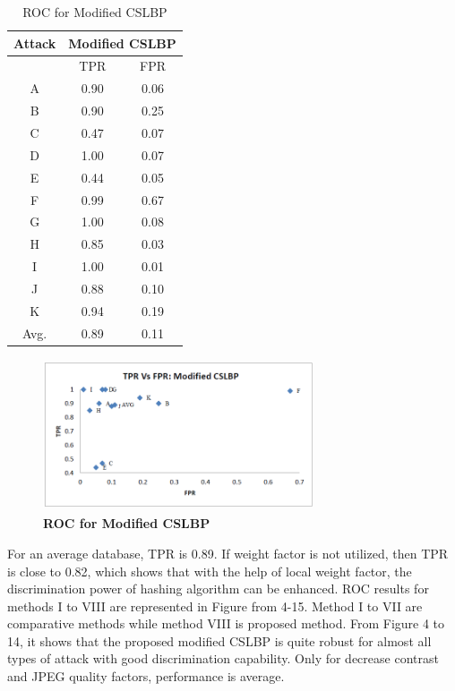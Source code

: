 \documentclass[12pt,a4paper]{jihmsp}
\begin{document}
{{\begin{table}[h]
	\centering
	
	\footnotesize
	
	\centering
	\begin{tabular}{*3c}
		
		\toprule
		
		Attack
		
		&  \multicolumn{2}{c}{ Modified CSLBP} 
		
		
		\\
		\midrule
		{}   &  TPR  &  FPR       \\
		
		
		A	& 0.90	& 0.06 \\
		B	& 0.90	& 0.25 \\
		C	& 0.47	& 0.07 \\
		D	& 1.00	& 0.07 \\
		E	& 0.44	& 0.05 \\
		F	& 0.99	& 0.67 \\
		G	& 1.00	& 0.08 \\
		H	& 0.85	& 0.03 \\
		I	& 1.00	& 0.01 \\
		J	& 0.88	& 0.10 \\
		K	& 0.94	& 0.19 \\
		Avg.& 0.89  & 0.11 \\  
		\bottomrule
	\end{tabular}
	\caption{ROC for Modified CSLBP}
	
\end{table}


\begin{figure}
	\centering
	\includegraphics[width=80mm, height=45mm]{ROCproposedmethod.png}
	\caption{\textbf{ROC for Modified CSLBP}}
\end{figure}

For an average database, TPR is 0.89. If weight factor is not utilized, then TPR is close to 0.82, which shows that with the help of local weight factor, the discrimination power of hashing algorithm can be enhanced. ROC results for methods I to VIII are represented in Figure from 4-15. Method I to VII are comparative methods while method VIII is proposed method. From Figure 4 to 14, it shows that the proposed modified CSLBP is quite robust for almost all types of attack with good discrimination capability. Only for decrease contrast and JPEG quality factors, performance is average.

}}
\end{document}
